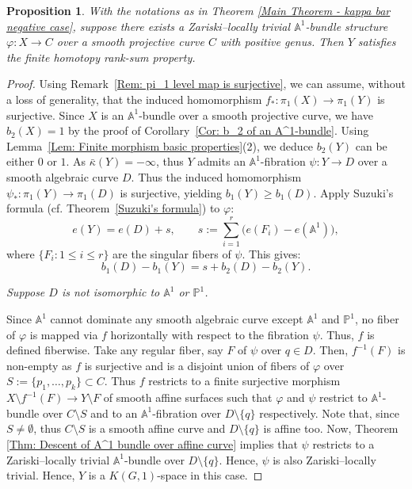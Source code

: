 \documentclass[12pt,reqno,twoside]{amsart}
\newtheorem{prop}[theorem]{Proposition}
\theoremstyle{definition}
\numberwithin{equation}{section}
\newcommand{\A}{\mathbb{A}}
\newcommand{\Kbar}{\bar{\kappa}}
\newcommand{\PP}{\mathbb{P}}
\begin{document}
\begin{prop}
    With the notations as in Theorem \ref{Main Theorem - kappa bar negative case}, suppose there exists a Zariski--locally trivial $\A^1$-bundle structure $\varphi: X\to C$ over a smooth projective curve $C$ with positive genus. Then $Y$ satisfies the finite homotopy rank-sum property.
\end{prop}

\begin{proof}
    Using Remark~\ref{Rem: pi_1 level map is surjective}, we can assume, without a loss of generality, that the induced homomorphism $f_\ast : \pi_1(X) \to \pi_1(Y)$ is surjective. Since $X$ is an $\A^1$-bundle over a smooth projective curve, we have $b_2(X)=1$ by the proof of Corollary~\ref{Cor: b_2 of an A^1-bundle}. Using Lemma~\ref{Lem: Finite morphism basic properties}(2), we deduce $b_2(Y)$ can be either $0$ or $1$. As $\Kbar(Y) = -\infty$, thus $Y$ admits an $\A^1$-fibration $\psi: Y \to D$ over a smooth algebraic curve $D$. Thus the induced homomorphism $\psi_\ast : \pi_1(Y) \to \pi_1(D)$ is surjective, yielding $b_1(Y) \ge b_1(D)$. Apply Suzuki’s formula (cf. Theorem~\ref{Suzuki's formula}) to $\varphi$:
    \[
    e(Y) = e(D) + s,\qquad 
    s := \sum_{i=1}^{r}\bigl(e(F_i)-e(\A^1)\bigr),
    \]
    where $\{F_i: 1\leq i\leq r\}$ are the singular fibers of $\psi$. This gives:
    \begin{equation}\label{eqn1}
        b_1(D) - b_1(Y) = s + b_2(D) - b_2(Y).
    \end{equation}

    \medskip
     \emph{Suppose $D$ is not isomorphic to $\A^1$ or $\PP^1$.}

    \medskip
    Since $\A^1$ cannot dominate any smooth algebraic curve except $\A^1$ and $\PP^1$, no fiber of $\varphi$ is mapped via $f$ horizontally with respect to the fibration $\psi$. Thus, $f$ is defined fiberwise. Take any regular fiber, say $F$ of $\psi$ over $q\in D$. Then, $f^{-1}(F)$ is non-empty as $f$ is surjective and is a disjoint union of fibers of $\varphi$ over $S:=\{p_1,\ldots,p_k\}\subset C$. Thus $f$ restricts to a finite surjective morphism $X\setminus f^{-1}(F) \to Y\setminus F$ of smooth affine surfaces such that $\varphi$ and $\psi$ restrict to $\A^1$-bundle over $C\setminus S$ and to an $\A^1$-fibration over $D\setminus \{q\}$ respectively. Note that, since $S\neq \emptyset$, thus $C\setminus S$ is a smooth affine curve and $D\setminus \{q\}$ is affine too. Now, Theorem \ref{Thm: Descent of A^1 bundle over affine curve} implies that $\psi$ restricts to a Zariski--locally trivial $\A^1$-bundle over $D\setminus \{q\}$. Hence, $\psi$ is also Zariski--locally trivial. Hence, $Y$ is a $K(G,1)$-space in this case.


\end{proof}
\end{document}
